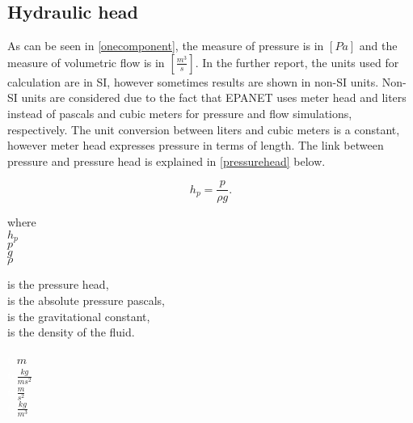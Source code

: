 \subsection{Hydraulic head}
\label{hydraulic_head}

As can be seen in \eqref{onecomponent}, the measure of pressure is in $[Pa]$ and the measure of volumetric flow is in $[\frac{m^3}{s}]$. In the further report, the units used for calculation are in SI, however sometimes results are shown in non-SI units. Non-SI units are considered due to the fact that EPANET uses meter head and liters instead of pascals and cubic meters for pressure and flow simulations, respectively. The unit conversion between liters and cubic meters is a constant, however meter head expresses pressure in terms of length. The link between pressure and pressure head is explained in \eqref{pressurehead} below. 

\begin{equation}
\label{pressurehead}
  h_p = \frac{p}{\rho g}.
\end{equation} 

\begin{minipage}[t]{0.20\textwidth}
where\\
\hspace*{8mm} $h_p$ \\
\hspace*{8mm} $p$ \\
\hspace*{8mm} $g$ \\
\hspace*{8mm} $\rho$ 
\end{minipage}
\begin{minipage}[t]{0.68\textwidth}
\vspace*{2mm}
is the pressure head,\\
is the absolute pressure pascals, \\
is the gravitational constant, \\
is the density of the fluid.
\end{minipage}
\begin{minipage}[t]{0.1\textwidth}
\vspace*{2mm}
\textcolor{White}{te}$\unit{m}$\\
\textcolor{White}{te}$\unit{\frac{kg}{ms^2}}$\\
\textcolor{White}{te}$\unit{\frac{m}{s^2}}$\\
\textcolor{White}{te}$\unit{\frac{kg}{m^3}}$
\end{minipage}

